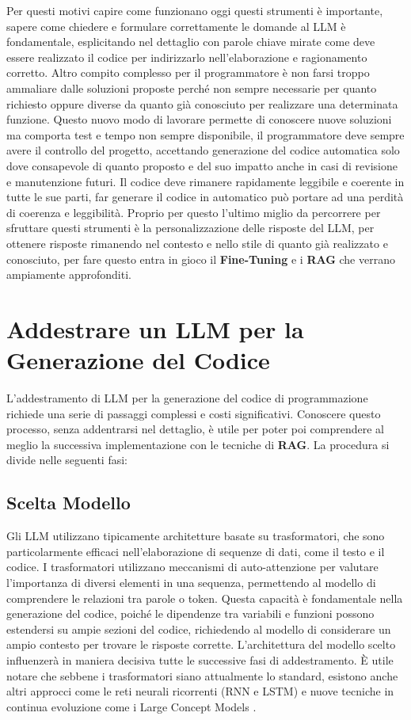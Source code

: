 \documentclass[12pt,a4paper,openright,twoside]{book}
\begin{document}
Per questi motivi capire come funzionano oggi questi strumenti è importante, sapere come chiedere e formulare correttamente le domande al LLM è fondamentale, esplicitando nel dettaglio con parole chiave mirate come deve essere realizzato il codice per indirizzarlo nell'elaborazione e ragionamento corretto.
Altro compito complesso per il programmatore è non farsi troppo ammaliare dalle soluzioni proposte perché non sempre necessarie per quanto richiesto oppure diverse da quanto già conosciuto
 per realizzare una determinata funzione.
Questo nuovo modo di lavorare permette di conoscere nuove soluzioni ma comporta test e tempo non sempre disponibile,
il programmatore deve sempre avere il controllo del progetto, accettando generazione del codice automatica solo dove consapevole di quanto proposto e del suo impatto anche in casi di revisione e manutenzione futuri.
Il codice deve rimanere rapidamente leggibile e coerente in tutte le sue parti, far generare il codice in automatico può portare ad una perdità di coerenza e leggibilità. 
Proprio per questo l'ultimo miglio da percorrere per sfruttare questi strumenti è la personalizzazione delle risposte del LLM, per ottenere risposte rimanendo nel contesto e nello stile di quanto già realizzato e conosciuto, per fare questo entra in gioco il \textbf{Fine-Tuning} e i \textbf{RAG} che verrano ampiamente approfonditi.

\chapter{Addestrare un LLM per la Generazione del Codice}

L'addestramento di LLM per la generazione del codice di programmazione richiede una serie di passaggi complessi e costi significativi.
Conoscere questo processo, senza addentrarsi nel dettaglio, è utile per poter poi comprendere al meglio la successiva implementazione con le tecniche di \textbf{RAG}.
La procedura si divide nelle seguenti fasi:
\section{Scelta Modello}
Gli LLM utilizzano tipicamente architetture basate su trasformatori, che sono particolarmente efficaci nell'elaborazione di sequenze di dati, come il testo e il codice.
I trasformatori utilizzano meccanismi di auto-attenzione per valutare l'importanza di diversi elementi in una sequenza,
permettendo al modello di comprendere le relazioni tra parole o token.
Questa capacità è fondamentale nella generazione del codice, poiché le dipendenze tra variabili e funzioni possono estendersi su ampie sezioni del codice, richiedendo al modello di considerare un ampio contesto per trovare le risposte corrette.
L'architettura del modello scelto influenzerà in maniera decisiva tutte le successive fasi di addestramento.
È utile notare che sebbene i trasformatori siano attualmente lo standard, esistono anche altri approcci come le reti neurali ricorrenti (RNN e LSTM) e nuove tecniche in continua evoluzione come i Large Concept Models \cite{code-llm-survey-2024}.
\end{document}
